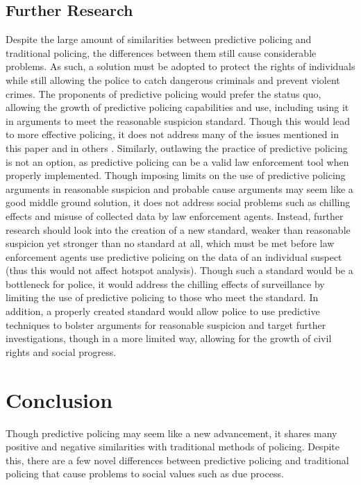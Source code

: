 \documentclass[12pt]{article} %
\begin{document}
\subsection{Further Research}
Despite the large amount of similarities between predictive policing and traditional policing, the differences between them still cause considerable problems. As such, a solution must be adopted to protect the rights of individuals while still allowing the police to catch dangerous criminals and prevent violent crimes. The proponents of predictive policing would prefer the status quo, allowing the growth of predictive policing capabilities and use, including using it in arguments to meet the reasonable suspicion standard. \cite{joh2014policing} Though this would lead to more effective policing, it does not address many of the issues mentioned in this paper and in others \cite{ferguson2012predictive}. Similarly, outlawing the practice of predictive policing is not an option, as predictive policing can be a valid law enforcement tool when properly implemented. Though imposing limits on the use of predictive policing arguments in reasonable suspicion and probable cause arguments may seem like a good middle ground solution, it does not address social problems such as chilling effects and misuse of collected data by law enforcement agents. Instead, further research should look into the creation of a new standard, weaker than reasonable suspicion yet stronger than no standard at all, which must be met before law enforcement agents use predictive policing on the data of an individual suspect (thus this would not affect hotspot analysis). Though such a standard would be a bottleneck for police, it would address the chilling effects of surveillance by limiting the use of predictive policing to those who meet the standard. In addition, a properly created standard would allow police to use predictive techniques to bolster arguments for reasonable suspicion and target further investigations, though in a more limited way, allowing for the growth of civil rights and social progress.  
  
\section{Conclusion}\label{sec:conclusion}
Though predictive policing may seem like a new advancement, it shares many positive and negative similarities with traditional methods of policing. Despite this, there are a few novel differences between predictive policing and traditional policing that cause problems to social values such as due process.
\end{document}
